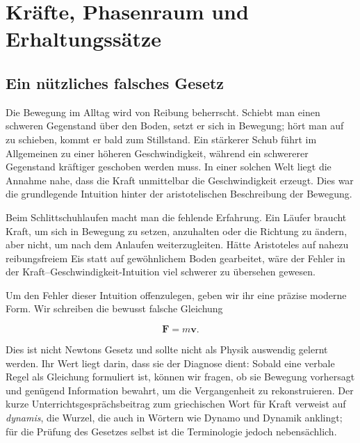 \chapter{Kräfte, Phasenraum und Erhaltungssätze}


\section{Ein nützliches falsches Gesetz}

Die Bewegung im Alltag wird von Reibung beherrscht. Schiebt man einen schweren Gegenstand über den Boden, setzt er sich in Bewegung; hört man auf zu schieben, kommt er bald zum Stillstand. Ein stärkerer Schub führt im Allgemeinen zu einer höheren Geschwindigkeit, während ein schwererer Gegenstand kräftiger geschoben werden muss. In einer solchen Welt liegt die Annahme nahe, dass die Kraft unmittelbar die Geschwindigkeit erzeugt. Dies war die grundlegende Intuition hinter der aristotelischen Beschreibung der Bewegung.

Beim Schlittschuhlaufen macht man die fehlende Erfahrung. Ein Läufer braucht Kraft, um sich in Bewegung zu setzen, anzuhalten oder die Richtung zu ändern, aber nicht, um nach dem Anlaufen weiterzugleiten. Hätte Aristoteles auf nahezu reibungsfreiem Eis statt auf gewöhnlichem Boden gearbeitet, wäre der Fehler in der Kraft--Geschwindigkeit-Intuition viel schwerer zu übersehen gewesen.

Um den Fehler dieser Intuition offenzulegen, geben wir ihr eine präzise moderne Form. Wir schreiben die bewusst falsche Gleichung

\begin{equation}
  \mathbf F=m\mathbf v.
  \label{eq:aristotle-vector-law}
\end{equation}

Dies ist nicht Newtons Gesetz und sollte nicht als Physik auswendig gelernt werden. Ihr Wert liegt darin, dass sie der Diagnose dient: Sobald eine verbale Regel als Gleichung formuliert ist, können wir fragen, ob sie Bewegung vorhersagt und genügend Information bewahrt, um die Vergangenheit zu rekonstruieren. Der kurze Unterrichtsgesprächsbeitrag zum griechischen Wort für Kraft verweist auf \emph{dynamis}, die Wurzel, die auch in Wörtern wie Dynamo und Dynamik anklingt; für die Prüfung des Gesetzes selbst ist die Terminologie jedoch nebensächlich.

